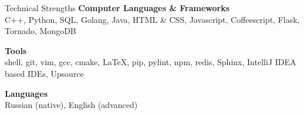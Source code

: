 \documentclass{resume}
\begin{document}
\begin{rSection}{Technical Strengths}
    {\bf Computer Languages \& Frameworks}\\ 
        C++, Python, SQL, Golang, Java, HTML \& CSS, Javascript, Coffeescript, Flask, Tornado, MongoDB

    {\bf Tools} \\ 
        shell, git, vim, gcc, cmake, LaTeX, pip, pylint, npm, redis, Sphinx, IntelliJ IDEA based IDEs, Upsource

    {\bf Languages} \\ 
        Russian (native), English (advanced)
\end{rSection}
\end{document}
